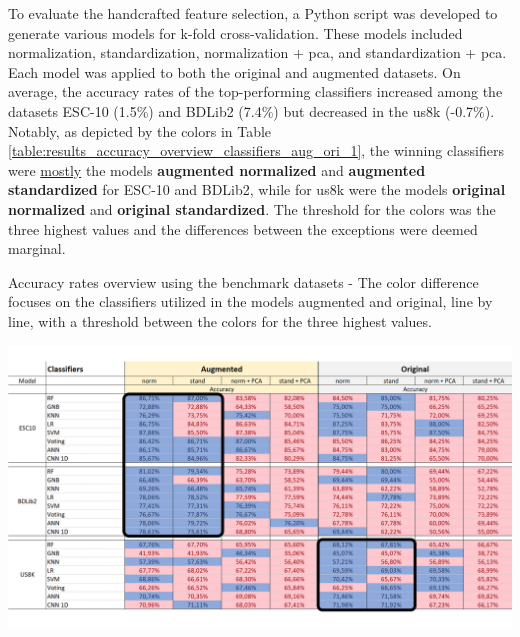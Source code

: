To evaluate the handcrafted feature selection, a Python script was developed to generate various models for k-fold cross-validation. These models included normalization, standardization, normalization + \gls{pca}, and standardization + \gls{pca}. Each model was applied to both the original and augmented datasets. On average, the accuracy rates of the top-performing classifiers increased among the datasets ESC-10 (1.5\%) and BDLib2 (7.4\%) but decreased in the \gls{us8k} (-0.7\%). Notably, as depicted by the colors in Table \ref{table:results_accuracy_overview_classifiers_aug_ori_1}, the winning classifiers were \underline{mostly} the models \textbf{augmented normalized} and \textbf{augmented standardized} for ESC-10 and BDLib2, while for \gls{us8k} were the models \textbf{original normalized} and \textbf{original standardized}. The threshold for the colors was the three highest values and the differences between the exceptions were deemed marginal.

\begin{table}[ht!]
    \caption[Accuracy rates overview using the benchmark datasets - Models augmented x original (Focus on the classifiers line by line)]{Accuracy rates overview using the benchmark datasets - The color difference focuses on the classifiers utilized in the models augmented and original, line by line, with a threshold between the colors for the three highest values.}
    \label{table:results_accuracy_overview_classifiers_aug_ori_1}
     \raggedright
    \includegraphics[width=1\textwidth]{resources/images/060-results/Results_classification_overview_aug_x_ori_1.png}
\end{table}

